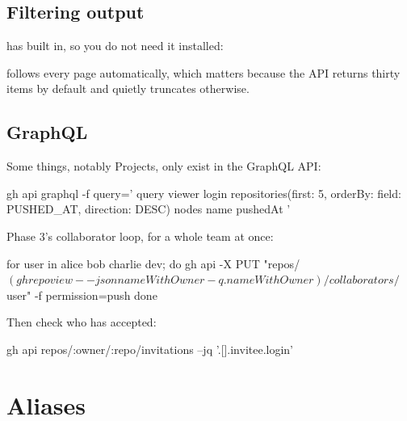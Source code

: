 \documentclass[11pt]{article}
\begin{document}
\subsection{Filtering output}

 has  built in, so you do not need it installed:


 follows every page automatically, which matters because the API
returns thirty items by default and quietly truncates otherwise.

\subsection{GraphQL}

Some things, notably Projects, only exist in the GraphQL API:

\begin{shell}
gh api graphql -f query='
  query {
    viewer {
      login
      repositories(first: 5, orderBy: {field: PUSHED_AT, direction: DESC}) {
        nodes { name pushedAt }
      }
    }
  }'
\end{shell}

\begin{tryit}
Phase 3's collaborator loop, for a whole team at once:

\begin{shell}
for user in alice bob charlie dev; do
  gh api -X PUT "repos/$(gh repo view --json nameWithOwner -q .nameWithOwner)/collaborators/$user" -f permission=push
done
\end{shell}

Then check who has accepted:

\begin{shell}
gh api repos/:owner/:repo/invitations --jq '.[].invitee.login'
\end{shell}
\end{tryit}

\section{Aliases}
\end{document}
